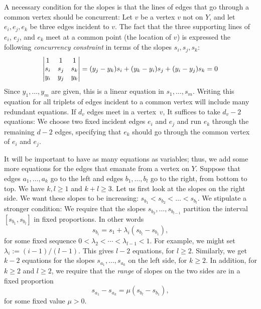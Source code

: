 \documentclass{patmorin}
\begin{document}
A necessary condition for the slopes is that the lines of edges that go
through a common vertex should be concurrent: Let $v$ be a vertex $v$
not on $Y$, and let $e_i, e_j, e_k$ be three edges incident to $v$.
The fact that the three supporting lines of $e_i$, $e_j$, and $e_k$
meet at a common point (the location of $v$) is expressed the following
\emph{concurrency constraint} in terms of the slopes $s_i,s_j,s_k$:
\begin{equation}\eqlabel{slope0} 
\left|
  \begin{matrix}
    1&1&1\\
s_i&s_j&s_k\\
y_i&y_j&y_k
  \end{matrix}
\right|=
   ({y_j-y_k}) s_i + ({y_k-y_i}) s_j 
          + ({y_i-y_j})s_k  = 0
\end{equation}
Since $y_1,\ldots,y_m$ are given, this is a linear equation
in $s_1,\ldots,s_m$.
Writing this equation for all triplets of edges incident to a common
vertex will include many redundant equations.
If $d_v$ edges meet in a vertex~$v$, 
 It suffices to take $d_v-2$ equations: We choose two fixed
incident edges $e_i$ and $e_j$ and run $e_k$ through the remaining
$d-2$ edges, specifying that $e_k$ should go through the common vertex
of $e_i$ and $e_j$.

It will be important to have as many equations as variables;
thus, we add some more equations for the edges that emanate from a
vertex on $Y$.
Suppose that edges $a_1,\ldots,a_k$ 
go to the left and edges $b_1,\ldots,b_l$ go to the
right, from bottom to top.
We have $k,l\ge1$ and $k+l\ge 3$.
Let us first look at the slopes on the right side.
We want these slopes to be increasing:
$s_{b_1} < s_{b_2} < \dots  <s_{b_l}$. We stipulate a stronger
condition:
We require that the slopes
$s_{b_2}, \dots, s_{b_{l-1}}$ partition the interval
$[s_{b_1},s_{b_l}]$ in fixed proportions. In other words
\begin{equation}
  \label{eq:proportion}
s_{b_i} = s_1 + \lambda_i(s_{b_{l}}-s_{b_1}),
\end{equation}
for some fixed sequence $0<\lambda_2<\cdots<\lambda_{l-1}<1$.
For example, we might set $\lambda_i := (i-1)/(l-1)$.
This gives $l-2$ equations, for $l\ge 2$. Similarly, we get
$k-2$ equations for the slopes
$s_{a_1}, \dots, s_{a_{k}}$ on the left side, for $k\ge 2$.
In addition, for $k\ge 2$ and $l\ge 2$, we require that the \emph{range} of
slopes
on the two sides are in a fixed proportion
\begin{equation}
  \label{eq:proportion2}
s_{a_1}-s_{a_{k}} = \mu (s_{b_{l}}-s_{b_1}),
\end{equation}
for some fixed value $\mu>0$.
\end{document}
